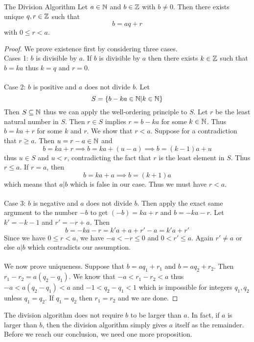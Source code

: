 \documentclass[a4paper]{article}
\begin{document}
\begin{thm}{The Division Algorithm}{} Let $a\in\mathbb{N}$ and $b\in\mathbb{Z}$ with $b\neq 0$. Then there exists unique $q,r\in\mathbb{Z}$ such that $$b=aq+r$$ with $0\leq r<a$. \tcbline
\begin{proof}
We prove existence first by considering three cases. \\
Cases 1: $b$ is divisible by $a$.  If $b$ is divisible by $a$ then there exists $k\in\mathbb{Z}$ such that $b=ka$ thus $k=q$ and $r=0$. \\~\\
Case 2: $b$ is positive and $a$ does not divide $b$. Let $$S=\{b-ka\in\mathbb{N}|k\in\mathbb{N}\}$$ Then $S\subseteq\mathbb{N}$ thus we can apply the well-ordering principle to $S$. Let $r$ be the least natural number in $S$. Then $r\in S$ implies $r=b-ka$ for some $k\in\mathbb{N}$. Thus $b=ka+r$ for some $k$ and $r$. We show that $r<a$. Suppose for a contradiction that $r\geq a$. Then $u=r-a\in\mathbb{N}$ and $$b=ka+r\implies b=ka+(u-a)\implies b=(k-1)a+u$$ thus $u\in S$ and $u<r$, contradicting the fact that $r$ is the least element in $S$. Thus $r\leq a$. If $r=a$, then $$b=ka+a\implies b=(k+1)a$$ which means that $a|b$ which is false in our case. Thus we must have $r<a$. \\~\\
Case 3: $b$ is negative and $a$ does not divide $b$. Then apply the exact same argument to the number $-b$ to get $(-b)=ka+r$ and $b=-ka-r$. Let $k'=-k-1$ and $r'=-r+a$. Then $$b=-ka-r=k'a+a+r'-a=k'a+r'$$ Since we have $0\leq r<a$, we have $-a<-r\leq 0$ and $0<r'\leq a$. Again $r'\neq a$ or else $a|b$ which contradicts our assumption. \\~\\
We now prove uniqueness. Suppose that $b=aq_1+r_1$ and $b=aq_2+r_2$. Then $r_1-r_2=a(q_2-q_1)$. We know that $-a<r_1-r_2<a$ thus $-a<a(q_2-q_1)<a$ and $-1<q_2-q_1<1$ which is impossible for integers $q_1,q_2$ unless $q_1=q_2$. If $q_1=q_2$ then $r_1=r_2$ and we are done. 
\end{proof}
\end{thm}

The division algorithm does not require $b$ to be larger than $a$. In fact, if $a$ is larger than $b$, then the division algorithm simply gives $a$ itself as the remainder. Before we reach our conclusion, we need one more proposition. 
\end{document}
